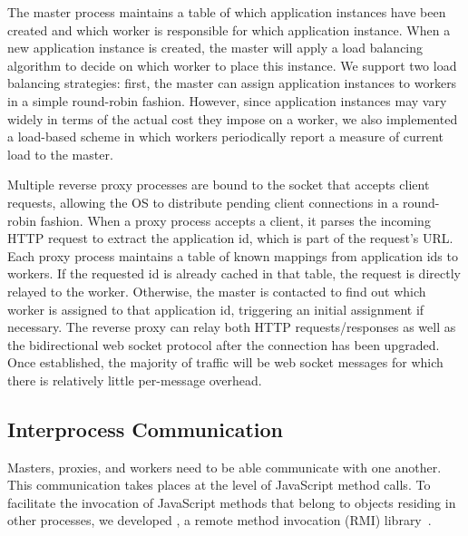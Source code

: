 The master process maintains a table of which application instances have been created and which
worker is responsible for which application instance.  When a new application instance is created,
the master will apply a load balancing algorithm to decide on which worker to place this instance.  
We support two load balancing strategies: first, the master can assign application instances
to workers in a simple round-robin fashion.  However, since application instances may vary
widely in terms of the actual cost they impose on a worker, we also implemented a load-based
scheme in which workers periodically report a measure of current load to the master.

Multiple reverse proxy processes are bound to the socket that accepts client requests, allowing
the OS to distribute pending client connections in a round-robin fashion.  
When a proxy process accepts a client, it parses the incoming HTTP request to extract the application
id, which is part of the request's URL.  Each proxy process maintains a table of known mappings from 
application ids to workers.  If the requested id is already cached in that table, the request is directly
relayed to the worker.  Otherwise, the master is contacted to find out which worker is assigned
to that application id, triggering an initial assignment if necessary.  The reverse proxy can 
relay both HTTP requests/responses as well as the bidirectional web socket protocol after the
connection has been upgraded.  Once established, the majority of traffic will be web socket
messages for which there is relatively little per-message overhead.  


\subsection{Interprocess Communication}
Masters, proxies, and workers need to be able communicate with one another. 
This communication takes places at the level of JavaScript method calls.
To facilitate the invocation of JavaScript methods that belong to objects residing 
in other processes, we developed \nodermi, a remote method invocation (RMI) 
library~\cite{nodermi}.

